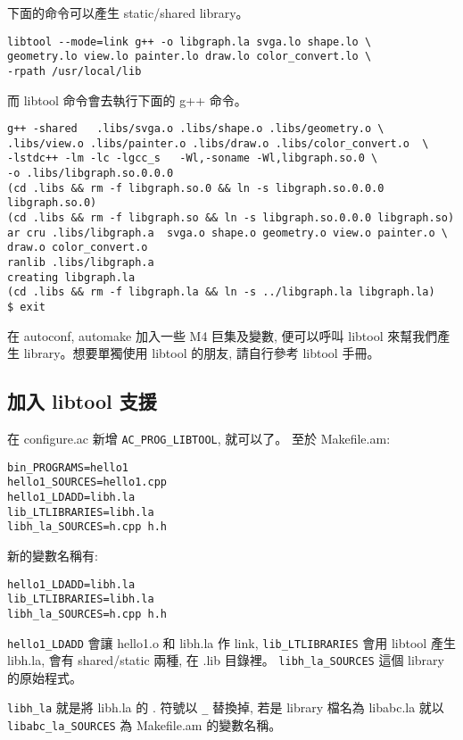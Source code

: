 \documentclass[12pt,a4]{article}
\begin{document}
\begin{CJK}{UTF8}{cwmu}
下面的命令可以產生 static/shared library。
\begin{verbatim}
libtool --mode=link g++ -o libgraph.la svga.lo shape.lo \
geometry.lo view.lo painter.lo draw.lo color_convert.lo \
-rpath /usr/local/lib
\end{verbatim}

而 libtool 命令會去執行下面的 g++ 命令。

\begin{verbatim}
g++ -shared   .libs/svga.o .libs/shape.o .libs/geometry.o \
.libs/view.o .libs/painter.o .libs/draw.o .libs/color_convert.o  \
-lstdc++ -lm -lc -lgcc_s   -Wl,-soname -Wl,libgraph.so.0 \
-o .libs/libgraph.so.0.0.0
(cd .libs && rm -f libgraph.so.0 && ln -s libgraph.so.0.0.0 libgraph.so.0)
(cd .libs && rm -f libgraph.so && ln -s libgraph.so.0.0.0 libgraph.so)
ar cru .libs/libgraph.a  svga.o shape.o geometry.o view.o painter.o \
draw.o color_convert.o
ranlib .libs/libgraph.a
creating libgraph.la
(cd .libs && rm -f libgraph.la && ln -s ../libgraph.la libgraph.la)
$ exit
\end{verbatim}

在 autoconf, automake 加入一些 M4 巨集及變數, 便可以呼叫 libtool 來幫我們產生
library。想要單獨使用 libtool 的朋友, 請自行參考 libtool 手冊。 

\subsection{加入 libtool 支援}
在 configure.ac 新增 \verb+AC_PROG_LIBTOOL+, 就可以了。
至於 Makefile.am:

\begin{verbatim}
bin_PROGRAMS=hello1
hello1_SOURCES=hello1.cpp
hello1_LDADD=libh.la
lib_LTLIBRARIES=libh.la
libh_la_SOURCES=h.cpp h.h
\end{verbatim}

新的變數名稱有:
\begin{verbatim}
hello1_LDADD=libh.la
lib_LTLIBRARIES=libh.la
libh_la_SOURCES=h.cpp h.h
\end{verbatim}

\verb+hello1_LDADD+ 會讓 hello1.o 和 libh.la 作 link,
\verb+lib_LTLIBRARIES+ 會用 libtool 產生 libh.la, 會有 shared/static 兩種,
在 .lib 目錄裡。
\verb+libh_la_SOURCES+ 這個 library 的原始程式。

\verb+libh_la+ 就是將 libh.la 的 . 符號以 \verb+_+ 替換掉,
若是 library 檔名為 libabc.la 就以 \verb+libabc_la_SOURCES+ 為 Makefile.am 的變數名稱。




\end{CJK}
\end{document}
